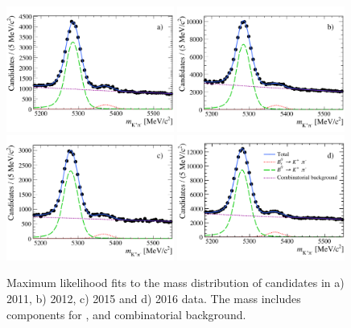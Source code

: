 \begin{figure}[t!]
  \centering
    \includegraphics[width=0.49\textwidth]{./Figs/LifetimeMeasurement/Bd2KPi_2011_mass_fit.pdf}
    \includegraphics[width=0.49\textwidth]{./Figs/LifetimeMeasurement/Bd2KPi_2012_mass_fit.pdf}
    \includegraphics[width=0.49\textwidth]{./Figs/LifetimeMeasurement/Bd2KPi_2015_mass_fit.pdf}
    \includegraphics[width=0.49\textwidth]{./Figs/LifetimeMeasurement/Bd2KPi_2016_mass_fit.pdf}
  \caption{Maximum likelihood fits to the mass distribution of \bdkpi candidates in a) 2011, b) 2012, c) 2015 and d) 2016 data. The mass \pdf includes components for \bdkpi, \bskpi and combinatorial background.}
  \label{fig:ntracksmassifts}
\end{figure}



